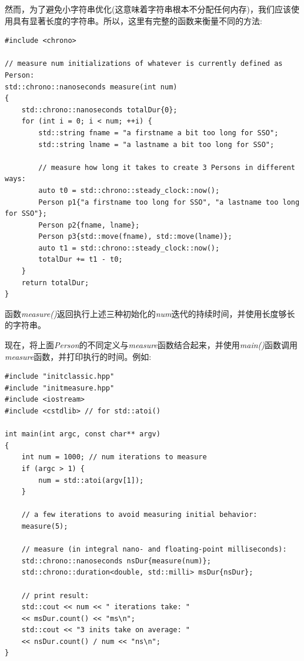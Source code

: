 然而，为了避免小字符串优化(这意味着字符串根本不分配任何内存)，我们应该使用具有显著长度的字符串。所以，这里有完整的函数来衡量不同的方法:\par

{\color{red}{basics/initmeasure.hpp}}

\begin{lstlisting}[caption={}]
#include <chrono>

// measure num initializations of whatever is currently defined as Person:
std::chrono::nanoseconds measure(int num)
{
	std::chrono::nanoseconds totalDur{0};
	for (int i = 0; i < num; ++i) {
		std::string fname = "a firstname a bit too long for SSO";
		std::string lname = "a lastname a bit too long for SSO";
		
		// measure how long it takes to create 3 Persons in different ways:
		auto t0 = std::chrono::steady_clock::now();
		Person p1{"a firstname too long for SSO", "a lastname too long for SSO"};
		Person p2{fname, lname};
		Person p3{std::move(fname), std::move(lname)};
		auto t1 = std::chrono::steady_clock::now();
		totalDur += t1 - t0;
	}
	return totalDur;
}
\end{lstlisting}

函数\textit{measure()}返回执行上述三种初始化的\textit{num}迭代的持续时间，并使用长度够长的字符串。\par

现在，将上面\textit{Person}的不同定义与\textit{measure}函数结合起来，并使用\textit{main()}函数调用\textit{measure}函数，并打印执行的时间。例如:\par

{\color{red}{basics/initclassicperf.cpp}}

\begin{lstlisting}[caption={}]
#include "initclassic.hpp"
#include "initmeasure.hpp"
#include <iostream>
#include <cstdlib> // for std::atoi()

int main(int argc, const char** argv)
{
	int num = 1000; // num iterations to measure
	if (argc > 1) {
		num = std::atoi(argv[1]);
	}

	// a few iterations to avoid measuring initial behavior:
	measure(5);
	
	// measure (in integral nano- and floating-point milliseconds):
	std::chrono::nanoseconds nsDur{measure(num)};
	std::chrono::duration<double, std::milli> msDur{nsDur};
	
	// print result:
	std::cout << num << " iterations take: "
	<< msDur.count() << "ms\n";
	std::cout << "3 inits take on average: "
	<< nsDur.count() / num << "ns\n";
}
\end{lstlisting}

